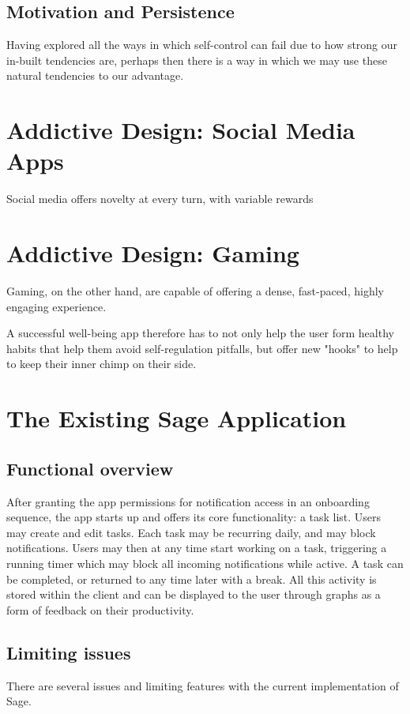 \subsection{Motivation and Persistence}
Having explored all the ways in which self-control can fail due to how strong our in-built tendencies are, perhaps then there is a way in which we may use these natural tendencies to our advantage.



\section{Addictive Design: Social Media Apps}
Social media offers novelty at every turn, with variable rewards

\section{Addictive Design: Gaming}
Gaming, on the other hand, are capable of offering a dense, fast-paced, highly engaging experience.

A successful well-being app therefore has to not only help the user form healthy habits that help them avoid self-regulation pitfalls, but offer new "hooks" to help to keep their inner chimp on their side.

\section{The Existing Sage Application}
\subsection{Functional overview}
After granting the app permissions for notification access in an onboarding sequence, the app starts up and offers its core functionality: a task list. Users may create and edit tasks. Each task may be recurring daily, and may block notifications. Users may then at any time start working on a task, triggering a running timer which may block all incoming notifications while active. A task can be completed, or returned to any time later with a break. All this activity is stored within the client and can be displayed to the user through graphs as a form of feedback on their productivity.


\subsection{Limiting issues}
There are several issues and limiting features with the current implementation of Sage.

